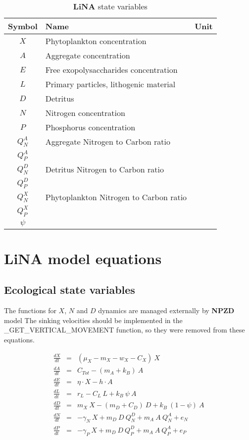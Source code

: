 \documentclass[fleqn]{article}                     %
\newcommand{\LiNA}{\textbf{LiNA} }
\begin{document}
\begin{table}[h!]
  \centering
  \caption{\LiNA state variables}
  \begin{tabular}{cll}
  \hline
    \textbf{Symbol} & \textbf{Name} & \textbf{Unit}\\ \hline
    $X$ & Phytoplankton concentration & \\
    $A$ & Aggregate concentration & \\
    $E$ & Free exopolysaccharides concentration & \\
    $L$ & Primary particles, lithogenic material & \\
    $D$ & Detritus & \\
    $N$ & Nitrogen concentration & \\
    $P$ & Phosphorus concentration & \\
    
    \hline
    $Q^A_N$ &Aggregate Nitrogen to Carbon ratio \\
    $Q^A_P$ \\
    $Q^D_N$ &Detritus Nitrogen to Carbon ratio\\
    $Q^D_P$\\
    $Q^X_N$&Phytoplankton Nitrogen to Carbon ratio\\
    $Q^X_P$\\
    $\psi$\\
  \end{tabular}
  \label{tab:stateVariables}
\end{table}


\section{\LiNA model equations}


\subsection{Ecological state variables}
The functions for $X$, $N$ and $D$ dynamics are managed externally by \textbf{NPZD} model
The sinking velocities should be implemented in the _GET_VERTICAL_MOVEMENT function, so they were removed from these equations.

\begin{eqnarray}
  \frac{dX}{dt} &=&  (\mu_X - m_X- w_X - C_X)\  X \\
  \frac{dA}{dt} &=&  C_{Tot} - (m_A + k_B) \ A\\
  \frac{dE}{dt} &=& \eta \cdot X - h\cdot A \\
  \frac{dL}{dt} &=& r_L - C_L\ L + k_B\ \psi\ A \\
  \frac{dD}{dt} &=& m_X \  X - (m_D + C_D)\ D + k_B\ (1-\psi)\ A \\
  \frac{dN}{dt} &=& -\gamma_N \ X + m_D\ D \  Q^D_N + m_A\ A\  Q^A_N + e_N\\
  \frac{dP}{dt} &=& -\gamma_P\  X + m_D\ D \  Q^D_P + m_A\ A\  Q^A_P + e_P
\end{eqnarray}
\end{document}
